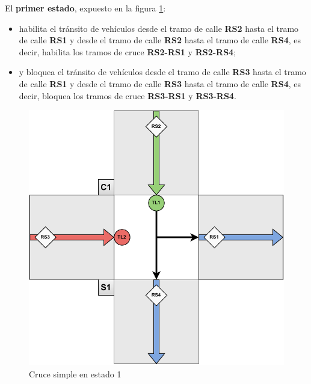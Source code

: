 El \textbf{primer estado}, expuesto en la figura \ref{fig:cruce_simple_estado_1}:
\begin{itemize}
    \item habilita el tránsito de vehículos desde el tramo de calle \textbf{RS2} hasta el tramo de calle \textbf{RS1} y desde el tramo de calle \textbf{RS2} hasta el tramo de calle \textbf{RS4}, es decir, habilita los tramos de cruce \textbf{RS2-RS1} y \textbf{RS2-RS4};
    \item y bloquea el tránsito de vehículos desde el tramo de calle \textbf{RS3} hasta el tramo de calle \textbf{RS1} y desde el tramo de calle \textbf{RS3} hasta el tramo de calle \textbf{RS4}, es decir, bloquea los tramos de cruce \textbf{RS3-RS1} y \textbf{RS3-RS4}.
\end{itemize}
\begin{figure}[H]
    \centering
    \includegraphics[width=1\linewidth]{text/image/DCruc-CS-Estado1.pdf}
    \caption{Cruce simple en estado 1}
    \label{fig:cruce_simple_estado_1}
\end{figure}

